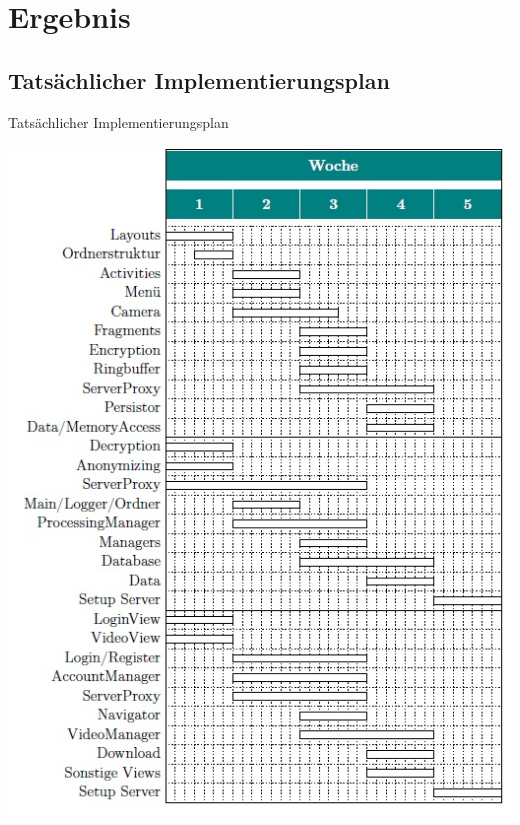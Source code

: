 \documentclass[19pt]{beamer}
\begin{document}
\section{Ergebnis}

\subsection{Tatsächlicher Implementierungsplan}
\begin{frame}{Tatsächlicher Implementierungsplan}
\begin{center}
\includegraphics[scale=0.4]{resources/ImpPlanPre.jpg}

\end{center}
\end{frame}
\end{document}
